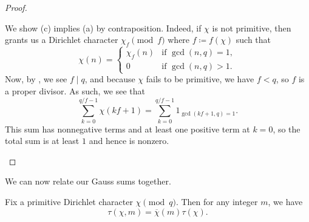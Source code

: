 \documentclass[../notes.tex]{subfiles}
\begin{document}
\begin{proof}
\begin{listalph}
		\item We show (c) implies (a) by contraposition. Indeed, if $\chi$ is not primitive, then  grants us a Dirichlet character $\chi_f\pmod f$ where $f\coloneqq f(\chi)$ such that
		\[\chi(n)=\begin{cases}
			\chi_f(n) & \text{if }\gcd(n,q)=1, \\
			0 & \text{if }\gcd(n,q)>1.
		\end{cases}\]
		Now, by , we see $f\mid q$, and because $\chi$ fails to be primitive, we have $f<q$, so $f$ is a proper divisor. As such, we see that
		\[\sum_{k=0}^{q/f-1}\chi(kf+1)=\sum_{k=0}^{q/f-1}1_{\gcd(kf+1,q)=1}.\]
		This sum has nonnegative terms and at least one positive term at $k=0$, so the total sum is at least $1$ and hence is nonzero.
		\qedhere
	\end{listalph}
\end{proof}
We can now relate our Gauss sums together.
\begin{lemma} \label{lem:relate-gauss-sums}
	Fix a primitive Dirichlet character $\chi\pmod q$. Then for any integer $m$, we have
	\[\tau(\chi,m)=\overline\chi(m)\tau(\chi).\]
\end{lemma}
\end{document}

